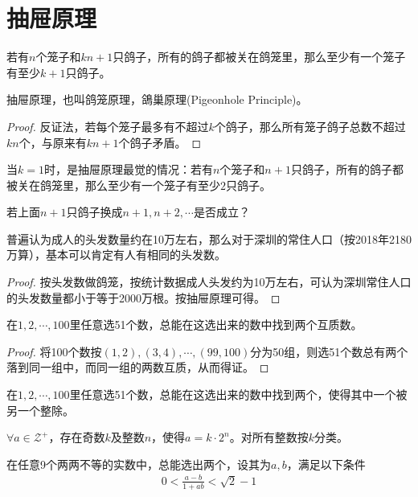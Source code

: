 
\section{抽屉原理}
\label{sec:pigeonhole-principle}

\begin{theorem}[抽屉原理]
  若有$n$个笼子和$kn+1$只鸽子，所有的鸽子都被关在鸽笼里，那么至少有一个笼子有至少$k+1$只鸽子。
\end{theorem}

抽屉原理，也叫鸽笼原理，鴿巢原理(Pigeonhole Principle)。

\begin{proof}
  反证法，若每个笼子最多有不超过$k$个鸽子，那么所有笼子鸽子总数不超过$kn$个，与原来有$kn+1$个鸽子矛盾。
\end{proof}

当$k=1$时，是抽屉原理最觉的情况：若有$n$个笼子和$n+1$只鸽子，所有的鸽子都被关在鸽笼里，那么至少有一个笼子有至少$2$只鸽子。

\think 若上面$n+1$只鸽子换成$n+1,n+2,\cdots$是否成立？

\begin{example}
  普遍认为成人的头发数量约在10万左右，那么对于深圳的常住人口（按2018年2180万算），基本可以肯定有人有相同的头发数。
\end{example}

\begin{proof}
  按头发数做鸽笼，按统计数据成人头发约为10万左右，可认为深圳常住人口的头发数量都小于等于2000万根。按抽屉原理可得。
\end{proof}

\begin{example}
  在$1,2,\cdots,100$里任意选51个数，总能在这选出来的数中找到两个互质数。
\end{example}

\begin{proof}
  将100个数按$(1,2), (3,4), \cdots, (99,100)$分为50组，则选51个数总有两个落到同一组中，而同一组的两数互质，从而得证。
\end{proof}

\begin{question}
  在$1,2,\cdots,100$里任意选51个数，总能在这选出来的数中找到两个，使得其中一个被另一个整除。
\end{question}
\hints $\forall a\in\mathcal{Z}^+$，存在奇数$k$及整数$n$，使得$a=k\cdot 2^n$。对所有整数按$k$分类。

\begin{example}
  在任意9个两两不等的实数中，总能选出两个，设其为$a,b$，满足以下条件
  \begin{align*}
    0 < \frac{a-b}{1+ab} < \sqrt2 -1
  \end{align*}
\end{example}

